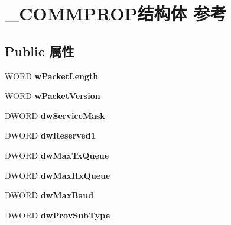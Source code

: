 \hypertarget{struct___c_o_m_m_p_r_o_p}{}\section{\+\_\+\+C\+O\+M\+M\+P\+R\+O\+P结构体 参考}
\label{struct___c_o_m_m_p_r_o_p}
\subsection*{Public 属性}
\begin{DoxyCompactItemize}
\item 
\mbox{\label{struct___c_o_m_m_p_r_o_p_a1ad3969b36d16a7e1f00bb787b7d5bee}} 
W\+O\+RD {\bfseries w\+Packet\+Length}
\item 
\mbox{\label{struct___c_o_m_m_p_r_o_p_a6c95c6c02891c71ad62da1993d306288}} 
W\+O\+RD {\bfseries w\+Packet\+Version}
\item 
\mbox{\label{struct___c_o_m_m_p_r_o_p_a6d61098a17979a6492689f0288c64add}} 
D\+W\+O\+RD {\bfseries dw\+Service\+Mask}
\item 
\mbox{\label{struct___c_o_m_m_p_r_o_p_a1361f21da530c80ca5479d5b022c1204}} 
D\+W\+O\+RD {\bfseries dw\+Reserved1}
\item 
\mbox{\label{struct___c_o_m_m_p_r_o_p_a032945eaf572c7df3358cb66131bddb6}} 
D\+W\+O\+RD {\bfseries dw\+Max\+Tx\+Queue}
\item 
\mbox{\label{struct___c_o_m_m_p_r_o_p_a030c681a6d7d0e3e70dd05ac313e26fa}} 
D\+W\+O\+RD {\bfseries dw\+Max\+Rx\+Queue}
\item 
\mbox{\label{struct___c_o_m_m_p_r_o_p_a11e5f0ada64de5fd9f3a403d182f1940}} 
D\+W\+O\+RD {\bfseries dw\+Max\+Baud}
\item 
\mbox{\label{struct___c_o_m_m_p_r_o_p_a2c6325c6cd97e366d7bee502adc98f2c}} 
D\+W\+O\+RD {\bfseries dw\+Prov\+Sub\+Type}
\item 
\mbox{\label{struct___c_o_m_m_p_r_o_p_a39dc006c6e84499fc3378288b19e89db}} 

\end{DoxyCompactItemize}
